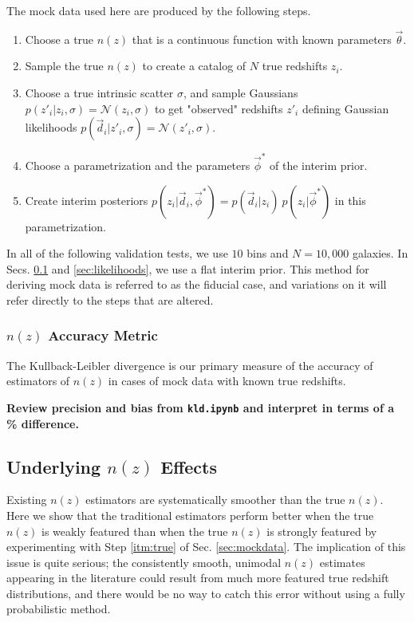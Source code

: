 \documentclass[iop]{emulateapj}
\begin{document}
The mock data used here are produced by the following steps.

\begin{enumerate}
	\item \label{itm:true} Choose a true $n(z)$ that is a continuous 
function with known parameters $\vec{\theta}$.
	\item \label{itm:sample} Sample the true $n(z)$ to create a catalog of 
$N$ true redshifts $z_{i}$.
	\item \label{itm:scatter} Choose a true intrinsic scatter $\sigma$, and 
sample Gaussians $p(z'_{i} | z_{i}, \sigma) = \mathcal{N}(z_{i}, \sigma)$ to 
get "observed" redshifts $z'_{i}$ defining Gaussian likelihoods $p(\vec{d}_{i} 
| z'_{i}, \sigma) = \mathcal{N}(z'_{i}, \sigma)$.
	\item \label{itm:interim} Choose a parametrization and the parameters 
$\vec{\phi}^{*}$ of the interim prior.
	\item \label{itm:posterior} Create interim posteriors $p(z_{i} | 
\vec{d}_{i}, \vec{\phi}^{*}) = p(\vec{d}_{i} | z_{i})\ p(z_{i} | 
\vec{\phi}^{*})$ in this parametrization.
\end{enumerate}

In all of the following validation tests, we use $10$ bins and $N = 10,000$ 
galaxies.  In Secs. \ref{sec:truth} and \ref{sec:likelihoods}, we use a flat 
interim prior.  This method for deriving mock data is referred to as the 
fiducial case, and variations on it will refer directly to the steps that are 
altered.

\subsubsection{$n(z)$ Accuracy Metric}
\label{sec:accuracy}

The Kullback-Leibler divergence is our primary measure of the accuracy of 
estimators of $n(z)$ in cases of mock data with known true redshifts.

\textbf{Review precision and bias from \texttt{kld.ipynb} and interpret in 
terms of a \% difference.}

\subsection{Underlying $n(z)$ Effects}
\label{sec:truth}

Existing $n(z)$ estimators are systematically smoother than the true $n(z)$.  
Here we show that the traditional estimators perform better when the true 
$n(z)$ is weakly featured than when the true $n(z)$ is strongly featured by 
experimenting with Step \ref{itm:true} of Sec. \ref{sec:mockdata}.  The 
implication of this issue is quite serious; the consistently smooth, unimodal 
$n(z)$ estimates appearing in the literature could result from much more 
featured true redshift distributions, and there would be no way to catch this 
error without using a fully probabilistic method.
\end{document}
